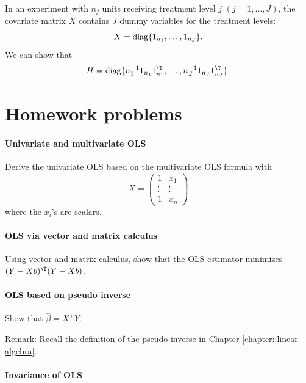 \begin{example}
\label{eg::anova-H}
In an experiment with $n_j$ units receiving treatment level $j$ $(j=1,\ldots, J)$, the covariate matrix $X$ contains $J$ dummy variables for the treatment levels:
$$
X =  \textup{diag}\{ 1_{n_1}, \ldots, 1_{n_J} \} .
$$
We can show that 
$$
H = \textup{diag}\{ n_1^{-1} 1_{n_1} 1_{n_1}^{\T} , \ldots, n_J^{-1} 1_{n_J} 1_{n_J}^{\T} \}.
$$
\end{example}


 






\section{Homework problems}

\paragraph{Univariate and multivariate OLS}

Derive the univariate OLS based on the multivariate OLS formula with
$$
X = \begin{pmatrix}
1& x_1 \\
\vdots & \vdots \\
1 & x_n
\end{pmatrix}
$$
where the $x_i$'s are scalars. 


\paragraph{OLS via vector and matrix calculus}

Using vector and matrix calculus, show that the OLS estimator minimizes
$(Y-Xb)^{\T}(Y-Xb)$.


\paragraph{OLS based on pseudo inverse}\label{hw3::ols-pseudoinverse}

Show that $\hat\beta = X^{+} Y$.


Remark: Recall the definition of the pseudo inverse in Chapter \ref{chapter::linear-algebra}. 


\paragraph{Invariance of OLS}\label{hw3::invariance-ols}

